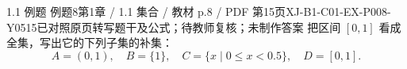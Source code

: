 \par\noindent\begin{minipage}{\linewidth}
\begin{bankitem}{1.1 例题 例题8}{第1章 / 1.1 集合 / 教材 p.8 / PDF 第15页}{XJ-B1-C01-EX-P008-Y0515}{已对照原页转写题干及公式；待教师复核；未制作答案}
把区间 $[0,1]$ 看成全集，写出它的下列子集的补集：
\[A=(0,1),\quad B=\{1\},\quad C=\{x\mid0\le x<0.5\},\quad D=[0,1].\]
\end{bankitem}
\end{minipage}\par\medskip
